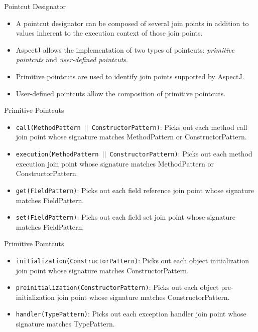 \documentclass[11pt]{beamer}
\begin{document}
\begin{frame}{Pointcut Designator}
  \begin{itemize}
    \item A pointcut designator can be composed of several join points in addition to values inherent to the execution context of those join points.
    \item AspectJ allows the implementation of two types of pointcuts: \emph{primitive pointcuts} and \emph{user-defined pointcuts}. 
    \item Primitive pointcuts are used to identify join points supported by AspectJ. 
    \item User-defined pointcuts allow the composition of primitive pointcuts. 
  \end{itemize}
\end{frame}

\begin{frame}{Primitive Pointcuts}
  \begin{itemize}
    \item \texttt{call(MethodPattern $||$ ConstructorPattern)}: 
    Picks out each method call join point whose signature matches MethodPattern or ConstructorPattern. 
    \item \texttt{execution(MethodPattern $||$ ConstructorPattern)}:
    Picks out each method execution join point whose signature matches MethodPattern or ConstructorPattern. 
    \item \texttt{get(FieldPattern)}: 
    Picks out each field reference join point whose signature matches FieldPattern. 
    \item \texttt{set(FieldPattern)}:
    Picks out each field set join point whose signature matches FieldPattern. 
  \end{itemize}
\end{frame}

\begin{frame}{Primitive Pointcuts}
  \begin{itemize}
    \item \texttt{initialization(ConstructorPattern)}:
    Picks out each object initialization join point whose signature matches ConstructorPattern. 
    \item \texttt{preinitialization(ConstructorPattern)}:
    Picks out each object pre-initialization join point whose signature matches ConstructorPattern. 
    \item \texttt{handler(TypePattern)}:
    Picks out each exception handler join point whose signature matches TypePattern. 
  \end{itemize}
\end{frame}
\end{document}
